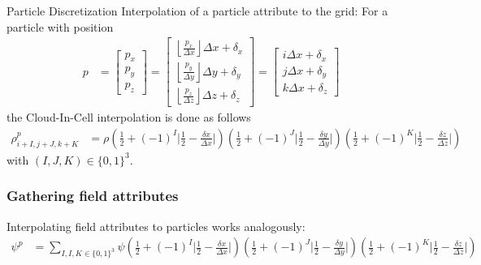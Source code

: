 \documentclass[5pt]{beamer}
\begin{document}
\begin{frame}{Particle Discretization}
  Interpolation of a particle attribute to the grid: For a particle with position
  {\scriptsize
  \begin{align}
  p &= \begin{bmatrix} p_x \\ p_y \\ p_z \end{bmatrix} = \begin{bmatrix}
      \left \lfloor{\frac{p_x}{\Delta x}}\right \rfloor \Delta x + \delta_x \\
      \left \lfloor{\frac{p_y}{\Delta y}}\right \rfloor \Delta y + \delta_y \\ 
      \left \lfloor{\frac{p_z}{\Delta z}}\right \rfloor \Delta z + \delta_z \end{bmatrix} = 
  \begin{bmatrix} i \Delta x + \delta_x \\ j \Delta x + \delta_y \\ k \Delta x + \delta_z \end{bmatrix}
  \end{align}
  }%
  the Cloud-In-Cell interpolation is done as follows
  {\scriptsize
  \begin{align}
  \rho^p_{i+I,j+J,k+K} &= \rho\left(\frac{1}{2} + (-1)^I \bigg\rvert \frac{1}{2} - \frac{\delta x}{\Delta x} \bigg\rvert \right)
                              \left(\frac{1}{2} + (-1)^J \bigg\rvert \frac{1}{2} - \frac{\delta y}{\Delta y} \bigg\rvert \right)
                              \left(\frac{1}{2} + (-1)^K \bigg\rvert \frac{1}{2} - \frac{\delta z}{\Delta z} \bigg\rvert \right)
  \end{align}
  with $(I,J,K) \in \{0,1\}^3$.
  }%
  \end{frame}
  \begin{frame}
  \frametitle{Gathering field attributes}
  Interpolating field attributes to particles works analogously:
  {\scriptsize
  \begin{align*}
      \psi^p &= \sum_{I,I,K \in \{0,1\}^3} \psi \left(\frac{1}{2} + (-1)^I \bigg\rvert \frac{1}{2} - \frac{\delta x}{\Delta x} \bigg\rvert \right)
                                                \left(\frac{1}{2} + (-1)^J \bigg\rvert \frac{1}{2} - \frac{\delta y}{\Delta y} \bigg\rvert \right)
                                                \left(\frac{1}{2} + (-1)^K \bigg\rvert \frac{1}{2} - \frac{\delta z}{\Delta z} \bigg\rvert \right)
  \end{align*}
  }%
  \end{frame}
\end{document}
